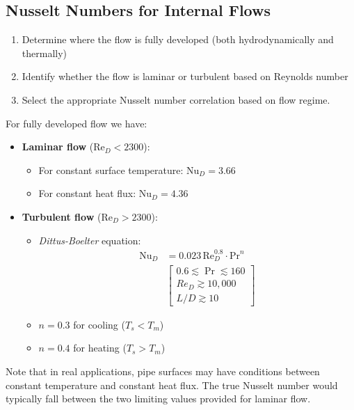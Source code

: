 


\subsection*{Nusselt Numbers for Internal Flows}

%
\begin{enumerate}
    \item Determine where the flow is fully developed (both hydrodynamically and thermally)
    \item Identify whether the flow is laminar or turbulent based on Reynolds number
    \item Select the appropriate Nusselt number correlation based on flow regime.
\end{enumerate}
%
\begin{definition}
 For fully developed flow we have:
\begin{itemize}
    \item \textbf{Laminar flow} ($\text{Re}_D < 2300$):
        \begin{itemize}
            \item For constant surface temperature: $\text{Nu}_D = 3.66$
            \item For constant heat flux: $\text{Nu}_D = 4.36$
        \end{itemize}
    
    \item \textbf{Turbulent flow} ($\text{Re}_D > 2300$):
        \begin{itemize}
            \item \textit{Dittus-Boelter} equation: 
            \[
                \begin{aligned}
                \text{Nu}_D &= 0.023\,\text{Re}_D^{0.8}\cdot\text{Pr}^n
                \\[1em]
                &\left[\begin{array}{l}
                0.6 \lesssim \operatorname{Pr} \lesssim 160 \\
                R e_D \gtrsim 10,000 \\
                L / D \gtrsim 10
                \end{array}\right]        
                \end{aligned}
            \]
            \item $n = 0.3$ for cooling ($T_s < T_m$)
            \item $n = 0.4$ for heating ($T_s > T_m$)
        \end{itemize}
\end{itemize}   
\end{definition}

Note that in real applications, pipe surfaces may have conditions between constant temperature and constant heat flux. The true Nusselt number would typically fall between the two limiting values provided for laminar flow.